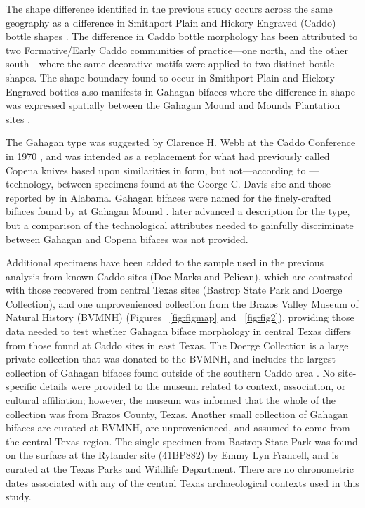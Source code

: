 \documentclass[review]{elsarticle}
\begin{document}
The shape difference identified in the previous study occurs across the same geography as a difference in Smithport Plain and Hickory Engraved (Caddo) bottle shapes \citep{RN11801,RN11782,RN11716,RN20852}. The difference in Caddo bottle morphology has been attributed to two Formative/Early Caddo communities of practice---one north, and the other south---where the same decorative motifs were applied to two distinct bottle shapes. The shape boundary found to occur in Smithport Plain and Hickory Engraved bottles \citep[Figure 1]{RN20852} also manifests in Gahagan bifaces where the difference in shape was expressed spatially between the Gahagan Mound and Mounds Plantation sites \citep{RN11783}.

The Gahagan type was suggested by Clarence H. Webb at the Caddo Conference in 1970 \citep{RN3684}, and was intended as a replacement for what \cite{RN800} had previously called Copena knives based upon similarities in form, but not---according to \cite{RN3684}---technology, between specimens found at the George C. Davis site and those reported by \cite{RN11562} in Alabama. Gahagan bifaces were named for the finely-crafted bifaces found by \cite{RN2740} at Gahagan Mound \citep{RN3684}. \citet[22]{RN4924} later advanced a description for the type, but a comparison of the technological attributes needed to gainfully discriminate between Gahagan and Copena bifaces was not provided.

Additional specimens have been added to the sample used in the previous analysis from known Caddo sites (Doc Marks and Pelican), which are contrasted with those recovered from central Texas sites (Bastrop State Park and Doerge Collection), and one unprovenienced collection from the Brazos Valley Museum of Natural History (BVMNH) (Figures ~\ref{fig:figmap} and ~\ref{fig:fig2}), providing those data needed to test whether Gahagan biface morphology in central Texas differs from those found at Caddo sites in east Texas. The Doerge Collection is a large private collection that was donated to the BVMNH, and includes the largest collection of Gahagan bifaces found outside of the southern Caddo area \citep[Table 5]{RN4924}. No site-specific details were provided to the museum related to context, association, or cultural affiliation; however, the museum was informed that the whole of the collection was from Brazos County, Texas. Another small collection of Gahagan bifaces are curated at BVMNH, are unprovenienced, and assumed to come from the central Texas region. The single specimen from Bastrop State Park was found on the surface at the Rylander site (41BP882) by Emmy Lyn Francell, and is curated at the Texas Parks and Wildlife Department. There are no chronometric dates associated with any of the central Texas archaeological contexts used in this study.
\end{document}

